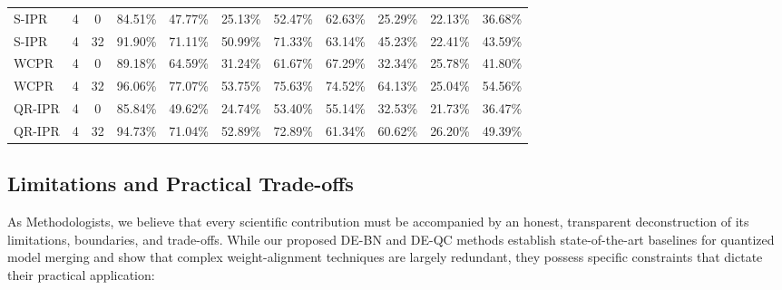 \documentclass{article}
\theoremstyle{plain}
\theoremstyle{definition}
\theoremstyle{remark}
\begin{document}
\begin{table}[htbp]
\begin{center}
\begin{scriptsize}
\begin{sc}
\begin{tabular}{lcccccccccc}
S-IPR & 4 & 0 & 84.51\% & 47.77\% & 25.13\% & 52.47\% & 62.63\% & 25.29\% & 22.13\% & 36.68\% \\
S-IPR & 4 & 32 & 91.90\% & 71.11\% & 50.99\% & 71.33\% & 63.14\% & 45.23\% & 22.41\% & 43.59\% \\
WCPR & 4 & 0 & 89.18\% & 64.59\% & 31.24\% & 61.67\% & 67.29\% & 32.34\% & 25.78\% & 41.80\% \\
WCPR & 4 & 32 & 96.06\% & 77.07\% & 53.75\% & 75.63\% & 74.52\% & 64.13\% & 25.04\% & 54.56\% \\
QR-IPR & 4 & 0 & 85.84\% & 49.62\% & 24.74\% & 53.40\% & 55.14\% & 32.53\% & 21.73\% & 36.47\% \\
QR-IPR & 4 & 32 & 94.73\% & 71.04\% & 52.89\% & 72.89\% & 61.34\% & 60.62\% & 26.20\% & 49.39\% \\
\bottomrule
\end{tabular}
\end{sc}
\end{scriptsize}
\end{center}
\end{table}

\subsection{Limitations and Practical Trade-offs}
\label{app:limitations}
As Methodologists, we believe that every scientific contribution must be accompanied by an honest, transparent deconstruction of its limitations, boundaries, and trade-offs. While our proposed DE-BN and DE-QC methods establish state-of-the-art baselines for quantized model merging and show that complex weight-alignment techniques are largely redundant, they possess specific constraints that dictate their practical application:
\end{document}
